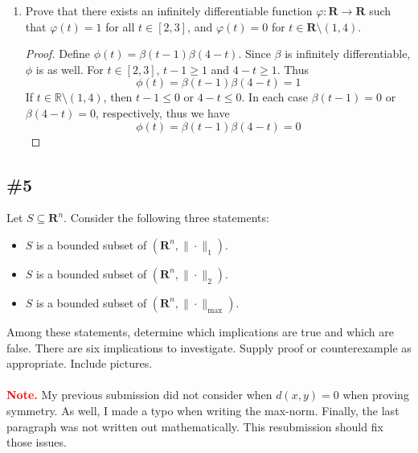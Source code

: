 \documentclass{article}
\newcommand{\R}{\mathbf{R}}
\theoremstyle{plain} %
\numberwithin{thm}{section} %
\theoremstyle{definition}
\begin{document}
\begin{enumerate}[label=(\alph*)]
\begin{proof}
            Since \(\alpha(t)\) is infinitely differentiable and \(\beta\) is composed of \(\alpha \), it follows that \(\beta\) is also infinitely differentiable.

        \end{proof}

        \item Prove that there exists an infinitely differentiable function $\varphi:\R\rightarrow \R$ such that $\varphi(t)=1$ for all $t\in [2,3]$, and $\varphi(t)=0$ for $t\in \R\setminus (1,4)$.

        \begin{proof}
            Define \(\phi (t) = \beta (t-1) \beta (4-t)\).
            Since \(\beta\) is infinitely differentiable, \(\phi\) is as well. For \(t \in [2,3]\), \(t-1 \geq 1\) and \(4-t \geq 1\). Thus
            \[
                \phi (t) = \beta(t-1) \beta (4-t) = 1
            \]
            If \(t \in \mathbb{R} \setminus (1,4)\), then \(t-1 \leq 0\) or \(4-t \leq 0\). In each case \(\beta(t-1) = 0\) or \(\beta (4-t) = 0\), respectively, thus we have
            \[
                \phi (t) = \beta (t-1) \beta (4-t) = 0
            \]

        \end{proof}
    \end{enumerate}

    \subsection{\#5}

    Let $S\subseteq \R^n$. Consider the following three statements:
        \begin{itemize}
            \item $S$ is a bounded subset of $(\R^n,\|\cdot\|_1)$.
            \item $S$ is a bounded subset of $(\R^n,\|\cdot\|_2)$.
            \item $S$ is a bounded subset of $(\R^n,\|\cdot\|_{\max})$.
        \end{itemize}
        Among these statements, determine which implications are true and which are false. There are six implications to investigate. Supply proof or counterexample as appropriate. Include pictures.
        \\\\
        \noindent\textbf{\textcolor{red}{Note.}} My previous submission did not consider when \(d(x,y) = 0\) when proving symmetry. As well, I made a typo when writing the max-norm. Finally, the last paragraph was not written out mathematically. This resubmission should fix those issues.
    
\end{document}
